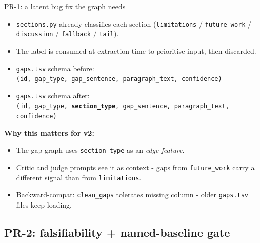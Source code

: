 \documentclass[10pt,aspectratio=169]{beamer}
\newcommand{\filename}[1]{\texttt{\small#1}}
\begin{document}
\begin{frame}[fragile]{PR-1: a latent bug fix the graph needs}
  \begin{itemize}
    \item \filename{sections.py} already classifies each section
      (\texttt{limitations} / \texttt{future\_work} / \texttt{discussion}
      / \texttt{fallback} / \texttt{tail}).
    \item The label is consumed at extraction time to prioritise input, then \alert{discarded}.
    \item \texttt{gaps.tsv} schema before:\\
      \scriptsize\texttt{(id, gap\_type, gap\_sentence, paragraph\_text, confidence)}
    \item \texttt{gaps.tsv} schema after:\\
      \scriptsize\texttt{(id, gap\_type,~\textbf{section\_type},~gap\_sentence, paragraph\_text, confidence)}
  \end{itemize}
  \vspace{0.5em}
  \textbf{Why this matters for v2:}
  \begin{itemize}
    \item The gap graph uses \texttt{section\_type} as an \emph{edge feature}.
    \item Critic and judge prompts see it as context -
      gaps from \texttt{future\_work} carry a different signal than from \texttt{limitations}.
    \item Backward-compat: \texttt{clean\_gaps} tolerates missing column - older
      \filename{gaps.tsv} files keep loading.
  \end{itemize}
\end{frame}


\subsection{PR-2: falsifiability + named-baseline gate}
\end{document}
